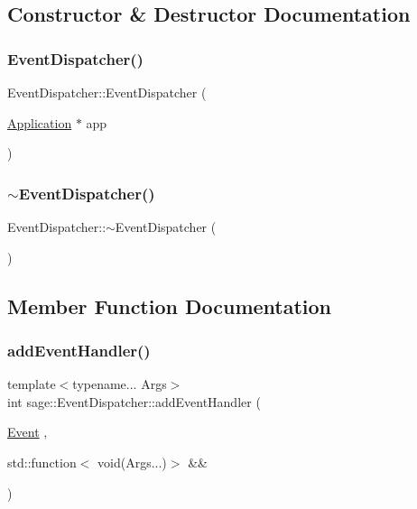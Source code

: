 \subsection{Constructor \& Destructor Documentation}
\mbox{\label{classsage_1_1EventDispatcher_a6af3114e66a9f42aa03e13058d63dd62}} 
\subsubsection{\texorpdfstring{EventDispatcher()}{EventDispatcher()}}
{\footnotesize\ttfamily Event\+Dispatcher\+::\+Event\+Dispatcher (\begin{DoxyParamCaption}\item[{\mbox{\hyperlink{classsage_1_1Application}{Application}} $\ast$}]{app }\end{DoxyParamCaption})}

\mbox{\label{classsage_1_1EventDispatcher_abb5f401014e87f03027d6c4450964e55}} 
\subsubsection{\texorpdfstring{$\sim$EventDispatcher()}{~EventDispatcher()}}
{\footnotesize\ttfamily Event\+Dispatcher\+::$\sim$\+Event\+Dispatcher (\begin{DoxyParamCaption}{ }\end{DoxyParamCaption})}



\subsection{Member Function Documentation}
\mbox{\label{classsage_1_1EventDispatcher_a871869f2a078e81c20a220a633d4e471}} 
\subsubsection{\texorpdfstring{addEventHandler()}{addEventHandler()}\hspace{0.1cm}{\footnotesize\ttfamily [1/2]}}
{\footnotesize\ttfamily template$<$typename... Args$>$ \\
int sage\+::\+Event\+Dispatcher\+::add\+Event\+Handler (\begin{DoxyParamCaption}\item[{\mbox{\hyperlink{namespacesage_afe706a25026cc74fe69b56d53a265d29}{Event}}}]{,  }\item[{std\+::function$<$ void(Args...)$>$ \&\&}]{ }\end{DoxyParamCaption})}

